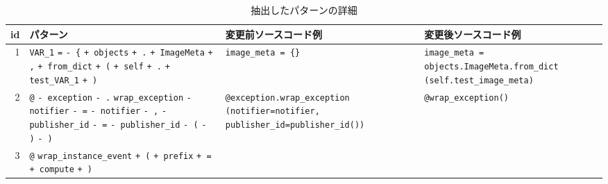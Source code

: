 \documentclass[submit,techrep,noauthor]{ipsj}
\begin{document}
\begin{table}[t]
    \centering
    \caption{抽出したパターンの詳細}
    \label{table:description}
    \begin{tabular}{r|p{6cm}|p{5cm}|p{5cm}}
        \hline \hline
        id & パターン & 変更前ソースコード例 & 変更後ソースコード例 \\ \hline
        1 & 
        \colorbox{lightgray!50}{\texttt{VAR\_1}} \colorbox{lightgray!50}{\texttt{=}} \colorbox{lightgray!50}{\texttt{- \{}} \colorbox{lightgray!50}{\texttt{+ objects}} \colorbox{lightgray!50}{\texttt{+ .}} \newline
        \colorbox{lightgray!50}{\texttt{+ ImageMeta}} \colorbox{lightgray!50}{\texttt{+ ,}} \colorbox{lightgray!50}{\texttt{+ from\_dict}} \colorbox{lightgray!50}{\texttt{+ (}} \newline
        \colorbox{lightgray!50}{\texttt{+ self}} \colorbox{lightgray!50}{\texttt{+ .}} \colorbox{lightgray!50}{\texttt{+ test\_VAR\_1}} \colorbox{lightgray!50}{\texttt{+ )}}
        & 
        \texttt{image\_meta = \{\}} 
        & 
        \texttt{image\_meta = \newline
        objects.ImageMeta.from\_dict \newline
        (self.test\_image\_meta)} \\
        \hline
        2 &
        \colorbox{lightgray!50}{\texttt{@}} \colorbox{lightgray!50}{\texttt{- exception}} \colorbox{lightgray!50}{\texttt{- .}} \colorbox{lightgray!50}{\texttt{wrap\_exception}}
        \newline
        \colorbox{lightgray!50}{\texttt{- notifier}} \colorbox{lightgray!50}{\texttt{- =}} \colorbox{lightgray!50}{\texttt{- notifier}} \colorbox{lightgray!50}{\texttt{- ,}}
        \newline
        \colorbox{lightgray!50}{\texttt{- publisher\_id}} \colorbox{lightgray!50}{\texttt{- =}} 
        \colorbox{lightgray!50}{\texttt{- publisher\_id}} \colorbox{lightgray!50}{\texttt{- (}} \colorbox{lightgray!50}{\texttt{- )}} \colorbox{lightgray!50}{\texttt{- )}}
        &
        \texttt{@exception.wrap\_exception
        \newline
        (notifier=notifier, publisher\_id=publisher\_id())}
        &
        \texttt{@wrap\_exception()}\\
        \hline
        3 &
        \colorbox{lightgray!50}{\texttt{@}} \colorbox{lightgray!50}{\texttt{wrap\_instance\_event}} \colorbox{lightgray!50}{\texttt{+ (}} 
        \newline
        \colorbox{lightgray!50}{\texttt{+ prefix}} \colorbox{lightgray!50}{\texttt{+ =}} \colorbox{lightgray!50}{\texttt{+ compute}} \colorbox{lightgray!50}{\texttt{+ )}}

\end{tabular}
\end{table}
\end{document}

